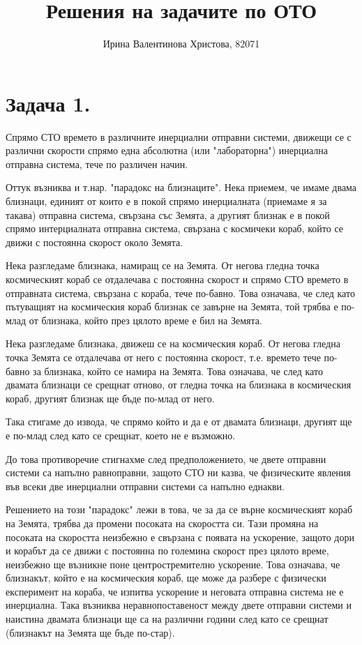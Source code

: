 \documentclass[a4paper,12pt]{article}
\title{Решения на задачите по ОТО}
\author{Ирина Валентинова Христова, 82071}
\begin{document}
\maketitle
\pagebreak
\section*{Задача 1.}
Спрямо СТО времето в различните инерциални отправни системи, движещи се с 
различни скорости спрямо една абсолютна (или "лабораторна") инерциална отправна система,
тече по различен начин.

Оттук възниква и т.нар. "парадокс на близнаците". Нека приемем, че имаме двама близнаци, 
единият от които е в покой спрямо инерциалната (приемаме я за такава) отправна система, свързана
със Земята, а другият близнак е в покой спрямо интерциалната отправна система, свързана 
с космичеки кораб, който се движи с постоянна скорост около Земята.

Нека разгледаме близнака, намиращ се на Земята. От негова гледна точка
космическият кораб се отдалечава с постоянна скорост и спрямо СТО времето в отправната система, 
свързана с кораба, тече по-бавно. Това означава, че след като пътуващият на космическия кораб близнак се завърне на Земята, 
той трябва е по-млад от близнака, който през цялото време е бил на Земята.

Нека разгледаме близнака, движеш се на космическия кораб. От негова гледна точка Земята се отдалечава от него с постоянна 
скорост, т.е. времето тече по-бавно за близнака, който се намира на Земята. Това означава, че след като двамата близнаци се срещнат отново, 
от гледна точка на близнака в космическия кораб, другият близнак ще бъде по-млад от него.

Така стигаме до извода, че спрямо който и да е от двамата близнаци, другият ще е по-млад след като се срещнат, което не е възможно.

До това противоречие стигнахме след предположението, че двете отправни системи са напълно равноправни, 
защото СТО ни казва, че физическите явления във всеки две инерциални отправни системи са напълно еднакви.

Решението на този "парадокс" лежи в това, че за да се върне космическият кораб на Земята, трябва да промени посоката на скоростта си. 
Тази промяна на посоката на скоростта неизбежно е свързана с появата на ускорение, защото дори и корабът да се движи с постоянна по големина скорост през цялото време, 
неизбежно ще възникне поне центростремително ускорение. Това означава, че близнакът, който е на космическия кораб, ще може да разбере с физически експеримент на кораба, че изпитва ускорение
и неговата отправна система не е инерциална. Така възниква неравнопоставеност между 
двете отправни системи и наистина двамата близнаци ще са на различни години след като се срещнат (близнакът на Земята ще бъде по-стар).
\end{document}
